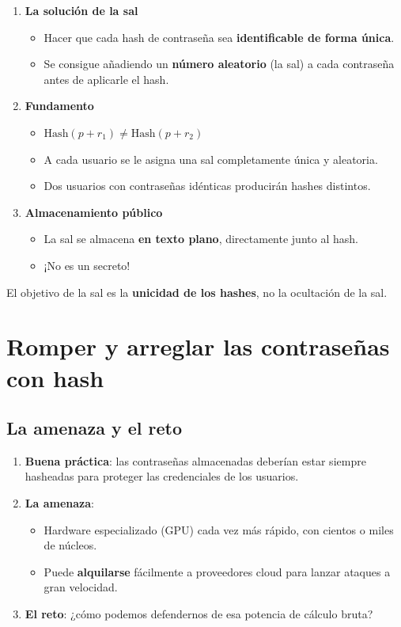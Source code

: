 \documentclass[11pt,a4paper]{report}
\begin{document}
\begin{enumerate}
  \item \textbf{La solución de la sal}
    \begin{itemize}
      \item Hacer que cada hash de contraseña sea \textbf{identificable de forma única}.
      \item Se consigue añadiendo un \textbf{número aleatorio} (la sal) a cada contraseña antes de aplicarle el hash.
    \end{itemize}
  \item \textbf{Fundamento}
    \begin{itemize}
      \item $\mathrm{Hash}(p + r_1) \neq \mathrm{Hash}(p + r_2)$
      \item A cada usuario se le asigna una sal completamente única y aleatoria.
      \item Dos usuarios con contraseñas idénticas producirán hashes distintos.
    \end{itemize}
  \item \textbf{Almacenamiento público}
    \begin{itemize}
      \item La sal se almacena \textbf{en texto plano}, directamente junto al hash.
      \item ¡No es un secreto!
    \end{itemize}
\end{enumerate}
 
\begin{importante}
El objetivo de la sal es la \textbf{unicidad de los hashes}, no la ocultación de la sal.
\end{importante}
 
\section{Romper y arreglar las contraseñas con hash}
 
\subsection{La amenaza y el reto}
\begin{enumerate}
  \item \textbf{Buena práctica}: las contraseñas almacenadas deberían estar siempre hasheadas para proteger las credenciales de los usuarios.
  \item \textbf{La amenaza}:
    \begin{itemize}
      \item Hardware especializado (GPU) cada vez más rápido, con cientos o miles de núcleos.
      \item Puede \textbf{alquilarse} fácilmente a proveedores cloud para lanzar ataques a gran velocidad.
    \end{itemize}
  \item \textbf{El reto}: ¿cómo podemos defendernos de esa potencia de cálculo bruta?
\end{enumerate}
 
\end{document}
